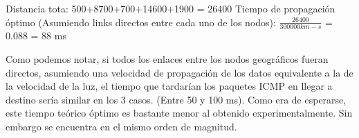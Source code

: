 Distancia tota: 500+8700+700+14600+1900 = 26400
Tiempo de propagación óptimo (Asumiendo links directos entre cada uno de los nodos):
$\frac{26400}{300000km-s}$ = 0.088 = 88 ms

Como podemos notar, si todos los enlaces entre los nodos geográficos fueran directos,
asumiendo una velocidad de propagación de los datos equivalente a la de la velocidad
de la luz, el tiempo que tardarían los paquetes ICMP en llegar a destino sería similar
en los 3 casos. (Entre 50 y 100 ms). Como era de esperarse, este tiempo teórico óptimo
es bastante menor al obtenido experimentalmente. Sin embargo se encuentra en el mismo
orden de magnitud.


















